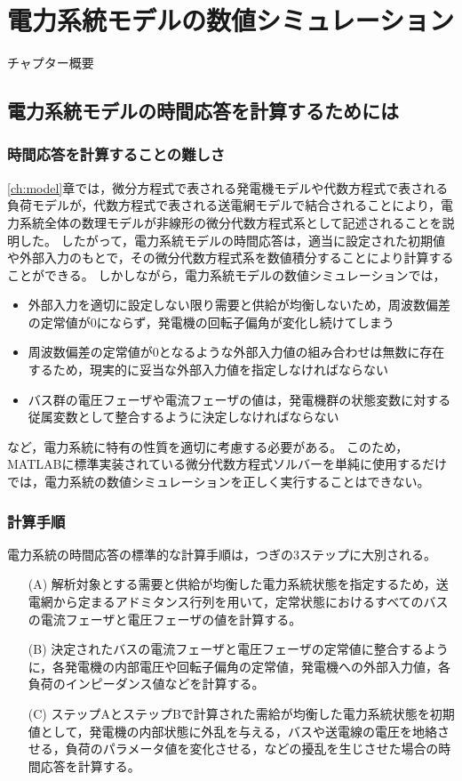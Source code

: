 \documentclass[tombow,dvipdfmx]{corona-a5-1.1}
\begin{document}
\chapter{電力系統モデルの数値シミュレーション}

チャプター概要

\section{電力系統モデルの時間応答を計算するためには}

\subsection{時間応答を計算することの難しさ}

\ref{ch:model}章では，微分方程式で表される発電機モデルや代数方程式で表される負荷モデルが，代数方程式で表される送電網モデルで結合されることにより，電力系統全体の数理モデルが非線形の微分代数方程式系として記述されることを説明した。
したがって，電力系統モデルの時間応答は，適当に設定された初期値や外部入力のもとで，その微分代数方程式系を数値積分することにより計算することができる。
しかしながら，電力系統モデルの数値シミュレーションでは，
\begin{itemize}
\item 外部入力を適切に設定しない限り需要と供給が均衡しないため，周波数偏差の定常値が0にならず，発電機の回転子偏角が変化し続けてしまう
\item 周波数偏差の定常値が0となるような外部入力値の組み合わせは無数に存在するため，現実的に妥当な外部入力値を指定しなければならない
\item バス群の電圧フェーザや電流フェーザの値は，発電機群の状態変数に対する従属変数として整合するように決定しなければならない
\end{itemize}
など，電力系統に特有の性質を適切に考慮する必要がある。
このため，MATLABに標準実装されている微分代数方程式ソルバーを単純に使用するだけでは，電力系統の数値シミュレーションを正しく実行することはできない。

\subsection{計算手順}\label{sec:numstep}

電力系統の時間応答の標準的な計算手順は，つぎの3ステップに大別される。

\begin{itemize}
\item[(A)] 解析対象とする需要と供給が均衡した電力系統状態を指定するため，送電網から定まるアドミタンス行列を用いて，定常状態におけるすべてのバスの電流フェーザと電圧フェーザの値を計算する。
\item[(B)] 決定されたバスの電流フェーザと電圧フェーザの定常値に整合するように，各発電機の内部電圧や回転子偏角の定常値，発電機への外部入力値，各負荷のインピーダンス値などを計算する。
\item[(C)] ステップAとステップBで計算された需給が均衡した電力系統状態を初期値として，発電機の内部状態に外乱を与える，バスや送電線の電圧を地絡させる，負荷のパラメータ値を変化させる，などの擾乱を生じさせた場合の時間応答を計算する。
\end{itemize}
\end{document}

